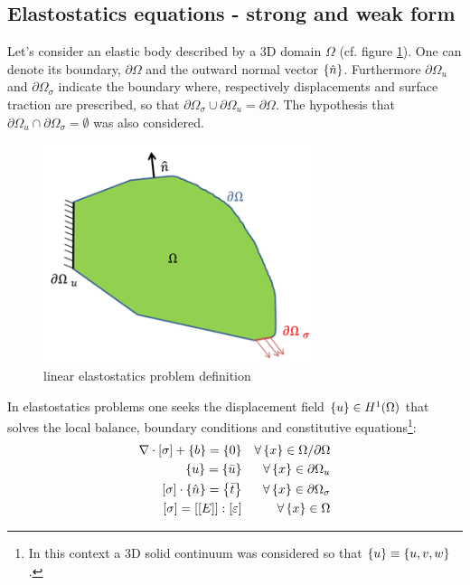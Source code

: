 \subsection{Elastostatics equations - strong and weak form}\label{subsec:1.1.1}
Let's consider an elastic body described by a 3D domain $\Omega$ (cf. figure \ref{fig.1}). One can denote its boundary, $\partial \Omega$ and the outward normal vector $\left\lbrace{\hat{n}}\right \rbrace$.
Furthermore $\partial \Omega_{u}$ and $\partial \Omega_{\sigma}$ indicate the boundary where, respectively displacements and surface traction are prescribed, so that $\partial \Omega_{\sigma} \cup \partial \Omega_{u} =\partial \Omega $. The hypothesis that $\partial \Omega_{u} \cap\partial \Omega_{\sigma}=\emptyset$ was also considered.\\
\begin{figure}[ht]
\centering
\includegraphics[width=8cm]{images/Ch1/solid}
\caption{linear elastostatics problem definition}
\label{fig.1}
\end{figure}
In elastostatics problems one seeks the displacement field $\left\lbrace{u}\right \rbrace \in H^1(\Omega)$ that solves the local balance, boundary conditions and constitutive equations\footnote{In this context a 3D solid continuum was considered so that $\left\lbrace{u}\right \rbrace\equiv \left\lbrace{u,v,w}\right \rbrace$.}:
\begin{eqnarray}
\label{eq.1.1}
\nabla \cdot \left[{\sigma}\right] + \left\lbrace{b}\right \rbrace=\left\lbrace{0}\right \rbrace  & & \forall \left\lbrace{x}\right \rbrace \in \Omega/\partial \Omega \\
\label{eq.1.2}
\left\lbrace{u}\right \rbrace=\left\lbrace{\bar{u}}\right \rbrace & & \forall \left\lbrace{x}\right \rbrace \in \partial \Omega_{u}  \\
\label{eq.1.3}
\left[{\sigma}\right]\cdot\left\lbrace{\hat{n}}\right \rbrace=\left\lbrace{\bar{t}}\right \rbrace & & \forall \left\lbrace{x}\right \rbrace \in \partial \Omega_{\sigma}
\\
\label{eq.1.4}
\left[{\sigma}\right]=\left[{\left[{E}\right]}\right]:\left[{ 	\varepsilon}\right] & & \forall \left\lbrace{x}\right \rbrace \in \Omega
\end{eqnarray}
